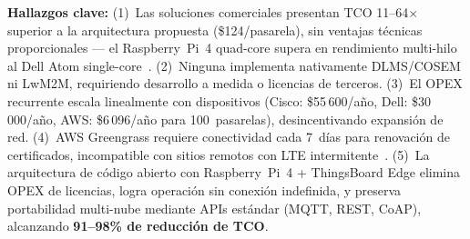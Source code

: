 \begin{table}[H]
\centering
\caption{Comparación: Soluciones Comerciales Edge vs Arquitectura Propuesta}
\label{tab:marco-comparativa-comercial}
%
\end{table}

\textbf{Hallazgos clave:} (1)~Las soluciones comerciales presentan TCO 11--64$\times$ superior a la arquitectura propuesta (\$124/pasarela), sin ventajas técnicas proporcionales --- el Raspberry~Pi~4 quad-core supera en rendimiento multi-hilo al Dell Atom single-core~\cite{ciscoCiscoIndustrialRouters2024,dellDellEdgeGateway2024}. (2)~Ninguna implementa nativamente DLMS/COSEM ni LwM2M, requiriendo desarrollo a medida o licencias de terceros. (3)~El OPEX recurrente escala linealmente con dispositivos (Cisco: \$55\,600/año, Dell: \$30\,000/año, AWS: \$6\,096/año para 100~pasarelas), desincentivando expansión de red. (4)~AWS Greengrass requiere conectividad cada 7~días para renovación de certificados, incompatible con sitios remotos con LTE intermitente~\cite{awsAWSIoTGreengrass2024}. (5)~La arquitectura de código abierto con Raspberry~Pi~4 + ThingsBoard Edge elimina OPEX de licencias, logra operación sin conexión indefinida, y preserva portabilidad multi-nube mediante APIs estándar (MQTT, REST, CoAP), alcanzando \textbf{91--98\% de reducción de TCO}.

